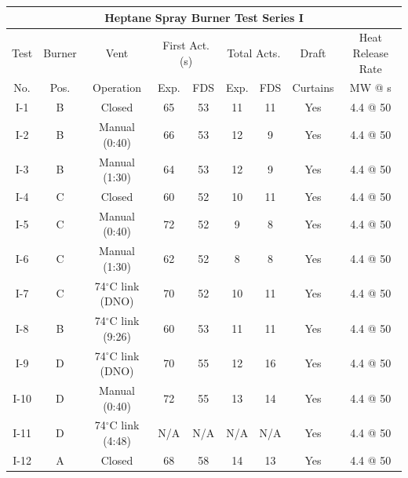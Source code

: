 \begin{table}[h!]
\begin{center}
\begin{tabular}{|c||c|c|c|c|c|c|c|c|}
\hline
\multicolumn{9}{|c|}{\bf Heptane Spray Burner Test Series I}  \\ \hline \hline
Test & Burner & Vent                    & \multicolumn{2}{|c|}{First Act. (s) } & \multicolumn{2}{|c|}{Total Acts.}  & Draft    & Heat Release Rate \\ \cline{4-7}
No.  & Pos.   & Operation               & Exp. & FDS                            & Exp.  & FDS                        & Curtains & MW @ s \\
\hline \hline
I-1   & B  & Closed                     & 65   & 53                             & 11   & 11     & Yes  & 4.4 @ 50  \\ \hline
I-2   & B  & Manual (0:40)              & 66   & 53                             & 12   & 9      & Yes  & 4.4 @ 50  \\ \hline
I-3   & B  & Manual (1:30)              & 64   & 53                             & 12   & 9      & Yes  & 4.4 @ 50  \\ \hline
I-4   & C  & Closed                     & 60   & 52                             & 10   & 11     & Yes  & 4.4 @ 50  \\ \hline
I-5   & C  & Manual (0:40)              & 72   & 52                             & 9    & 8      & Yes  & 4.4 @ 50  \\ \hline
I-6   & C  & Manual (1:30)              & 62   & 52                             & 8    & 8      & Yes  & 4.4 @ 50  \\ \hline
I-7   & C  & 74$^\circ$C link (DNO)     & 70   & 52                             & 10   & 11     & Yes  & 4.4 @ 50  \\ \hline
I-8   & B  & 74$^\circ$C link (9:26)    & 60   & 53                             & 11   & 11     & Yes  & 4.4 @ 50  \\ \hline
I-9   & D  & 74$^\circ$C link (DNO)     & 70   & 55                             & 12   & 16     & Yes  & 4.4 @ 50  \\ \hline
I-10  & D  & Manual (0:40)              & 72   & 55                             & 13   & 14     & Yes  & 4.4 @ 50  \\ \hline
I-11  & D  & 74$^\circ$C link (4:48)    & N/A  & N/A                            & N/A  & N/A    & Yes  & 4.4 @ 50  \\ \hline
I-12  & A  & Closed                     & 68   & 58                             & 14   & 13     & Yes  & 4.4 @ 50  \\ \hline

\end{tabular}
\end{center}
\end{table}
